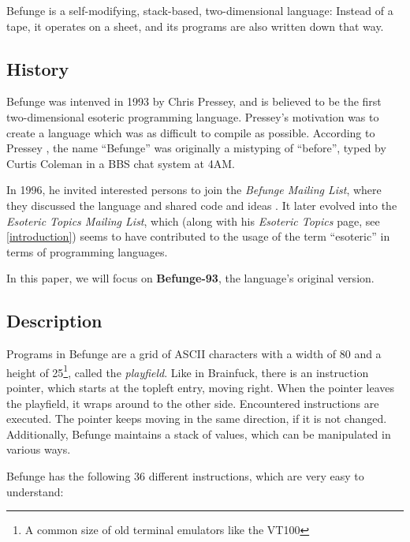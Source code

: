 Befunge is a self-modifying, stack-based, two-dimensional language: Instead of a tape, it operates on a sheet, and its programs are also written down that way.

\subsection{History}

Befunge was intenved in 1993 by Chris Pressey, and is believed to be the first two-dimensional esoteric programming language. Pressey's motivation was to create a language which was as difficult to compile as possible. According to Pressey \cite{presseycoleman}, the name “Befunge” was originally a mistyping of “before”, typed by Curtis Coleman in a BBS chat system at 4AM.

In 1996, he invited interested persons to join the \emph{Befunge Mailing List}, where they discussed the language and shared code and ideas \cite{pressey1996welcome}. It later evolved into the \emph{Esoteric Topics Mailing List}, which (along with his \emph{Esoteric Topics} page, see \cref{introduction}) seems to have contributed to the usage of the term “esoteric” in terms of programming languages.

In this paper, we will focus on \textbf{Befunge-93}, the language's original version.

\subsection{Description}

Programs in Befunge are a grid of ASCII characters with a width of 80 and a height of 25\footnote{A common size of old terminal emulators like the VT100}, called the \emph{playfield}. Like in Brainfuck, there is an instruction pointer, which starts at the topleft entry, moving right. When the pointer leaves the playfield, it wraps around to the other side. Encountered instructions are executed. The pointer keeps moving in the same direction, if it is not changed. Additionally, Befunge maintains a stack of values, which can be manipulated in various ways.

Befunge has the following 36 different instructions, which are very easy to understand:

